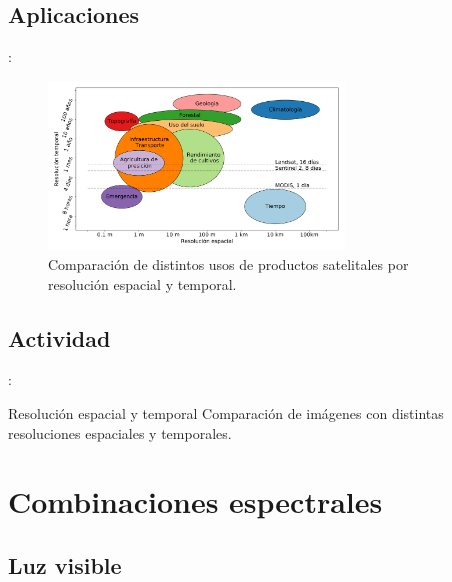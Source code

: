 \documentclass[handout,aspectratio=169]{beamer}
\begin{document}
\subsection{Aplicaciones}

\begin{frame}{\secname : \subsecname}
    \begin{figure}[h!]
        \centering
        \includegraphics[width=0.7\textwidth]{fig:evst.png}
        \caption{Comparación de distintos usos de productos satelitales por resolución espacial y temporal.}
        \label{fig:evst}
    \end{figure}
\end{frame}

\subsection{Actividad}

\begin{frame}{\secname : \subsecname}
    \begin{alertblock}{Resolución espacial y temporal}
        Comparación de imágenes con distintas resoluciones espaciales y temporales.
    \end{alertblock}
\end{frame}


\section{Combinaciones espectrales}
\subsection{Luz visible}
\end{document}
